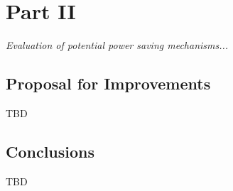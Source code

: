 \documentclass{article}
\begin{document}
\section{Part II}

\emph{Evaluation of potential power saving mechanisms...}

\subsection{Proposal for Improvements}
TBD

\subsection{Conclusions}
TBD



\end{document}
